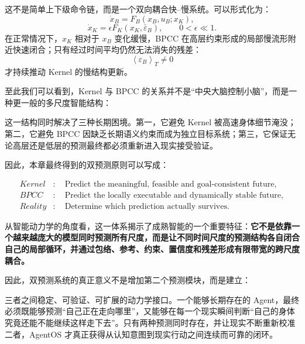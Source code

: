 这不是简单上下级命令链，而是一个双向耦合快--慢系统。可以形式化为：
\[
\dot x_B
=
F_B
(x_B,u_B;x_K),
\]
\[
\dot x_K
=
\epsilon
F_K
(x_K,\bar\varepsilon_B),
\qquad
0<\epsilon\ll1.
\]
在正常情况下，$x_K$ 相对于 $x_B$ 变化缓慢，BPCC 在高层约束形成的局部慢流形附近快速闭合；只有经过时间平均仍然无法消失的残差：
\[
\left\langle
\varepsilon_B
\right\rangle_T
\neq0
\]
才持续推动 Kernel 的慢结构更新。

至此我们可以看到，Kernel 与 BPCC 的关系并不是“中央大脑控制小脑”，而是一种更一般的多尺度智能结构：

\begin{statementbox}
\centering
{}
\end{statementbox}

这一结构同时解决了三种长期困境。第一，它避免 Kernel 被高速身体细节淹没；第二，它避免 BPCC 因缺乏长期语义约束而成为独立目标系统；第三，它保证无论高层还是低层的预测最终都必须重新进入现实接受验证。

因此，本章最终得到的双预测原则可以写成：

\[
\boxed{
\begin{aligned}
Kernel &: \quad
\text{Predict the meaningful, feasible and goal-consistent future},\\
BPCC &: \quad
\text{Predict the locally executable and dynamically stable future},\\
Reality &: \quad
\text{Determine which prediction actually survives}.
\end{aligned}
}
\]

从智能动力学的角度看，这一体系揭示了成熟智能的一个重要特征：\textbf{它不是依靠一个越来越庞大的模型同时预测所有尺度，而是让不同时间尺度的预测结构各自闭合自己的局部循环，并通过包络、参考、约束、置信度和残差形成有限带宽的跨尺度耦合。}

因此，双预测系统的真正意义不是增加第二个预测模块，而是建立：

\begin{statementbox}
\centering
{}
\end{statementbox}

三者之间稳定、可验证、可扩展的动力学接口。一个能够长期存在的 Agent，最终必须既能够预测“自己正在走向哪里”，又能够在每一个现实瞬间判断“自己的身体究竟还能不能继续这样走下去”。只有两种预测同时存在，并让现实不断重新校准二者，AgentOS 才真正获得从认知意图到现实行动之间连续而可靠的闭环。
